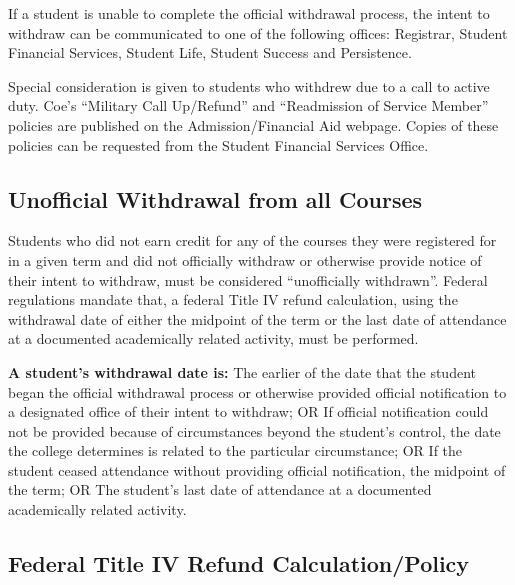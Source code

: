 \documentclass[
  letterpaper,
]{scrbook}
\begin{document}
If a student is unable to complete the official withdrawal process, the
intent to withdraw can be communicated to one of the following offices:
Registrar, Student Financial Services, Student Life, Student Success and
Persistence.

Special consideration is given to students who withdrew due to a call to
active duty. Coe's ``Military Call Up/Refund'' and ``Readmission of
Service Member'' policies are published on the Admission/Financial Aid
webpage. Copies of these policies can be requested from the Student
Financial Services Office.

\hypertarget{unofficial-withdrawal-from-all-courses}{%
\subsection{Unofficial Withdrawal from all
Courses}\label{unofficial-withdrawal-from-all-courses}}

Students who did not earn credit for any of the courses they were
registered for in a given term and did not officially withdraw or
otherwise provide notice of their intent to withdraw, must be considered
``unofficially withdrawn''. Federal regulations mandate that, a federal
Title IV refund calculation, using the withdrawal date of either the
midpoint of the term or the last date of attendance at a documented
academically related activity, must be performed.

\textbf{A student's withdrawal date is:} The earlier of the date that
the student began the official withdrawal process or otherwise provided
official notification to a designated office of their intent to
withdraw; OR If official notification could not be provided because of
circumstances beyond the student's control, the date the college
determines is related to the particular circumstance; OR If the student
ceased attendance without providing official notification, the midpoint
of the term; OR The student's last date of attendance at a documented
academically related activity.

\hypertarget{sec-federal-title-IV-refund-calculation-policy}{%
\subsection{Federal Title IV Refund
Calculation/Policy}\label{sec-federal-title-IV-refund-calculation-policy}}
\end{document}
